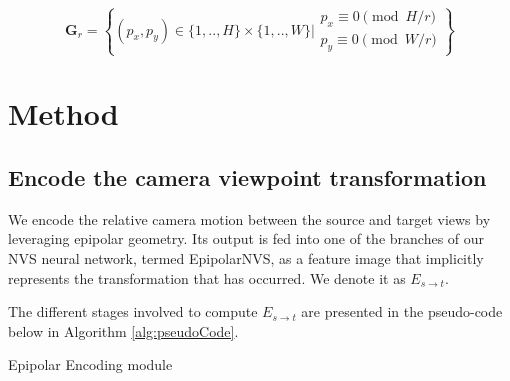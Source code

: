 \begin{equation}
    \mathbf{G}_{r} = \left\{(p_{x},p_{y}) \in \{1,..,H\}\times \{1,..,W\} \Big\rvert \begin{array}{l}
                    p_x \equiv 0 \pmod{H/r}\\
             p_y \equiv 0 \pmod{W/r}
              \end{array}\right\}
\end{equation}

\section{Method}

\subsection{Encode the camera viewpoint transformation}

We encode the relative camera motion between the source and target views by leveraging epipolar geometry. Its output is fed into one of the branches of our \ac{NVS} neural network, termed EpipolarNVS, as a feature image that implicitly represents the transformation that has occurred. We denote it as $E_{s\xrightarrow{}t}$.\newline 

The different stages involved to compute $E_{s\xrightarrow{}t}$ are presented in the pseudo-code below in Algorithm \ref{alg:pseudoCode}. \newline

\begin{algorithm}[htp!]
  \caption{Epipolar Encoding module \label{alg:pseudoCode}}
  
  \medskip
  
\end{algorithm}

